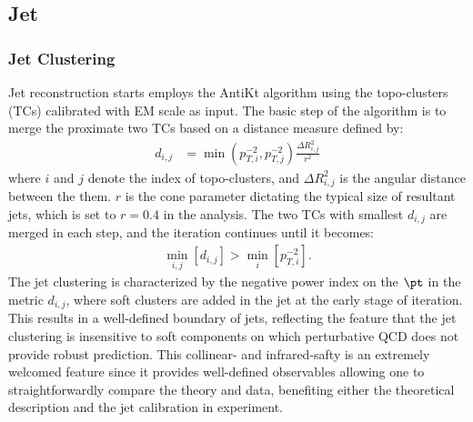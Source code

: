 


\subsection{Jet} \label{sec::objDef::jets}
%
\subsubsection{Jet Clustering} \label{sec::objDef::jets::clustering}
Jet reconstruction starts employs the AntiKt algorithm \cite{141_antiKt} using the topo-clusters (TCs) calibrated with EM scale as input.
The basic step of the algorithm is to merge the proximate two TCs based on a distance measure defined by:
\begin{align}
d_{i,j} & = \min(p_{T,i}^{-2},p_{T,j}^{-2}) \frac{\Delta R^2_{i,j}}{r^2} 
\end{align}
where $i$ and $j$ denote the index of topo-clusters, and $\Delta R^2_{i,j}$ is the angular distance between the them.
$r$ is the cone parameter dictating the typical size of resultant jets, which is set to $r=0.4$ in the analysis.
The two TCs with smallest $d_{i,j}$ are merged in each step, and the iteration continues until it becomes:
\begin{align}
\min_{i,j} \left[ d_{i,j} \right] > \min_{i} \left[ p_{T,i}^{-2} \right].
\end{align}
The \antikt jet clustering is characterized by the negative power index on the $\pt$ in the metric $d_{i,j}$, 
where soft clusters are added in the jet at the early stage of iteration.
This results in a well-defined boundary of jets, reflecting the feature that the jet clustering is insensitive to soft components on which perturbative QCD does not provide robust prediction. This collinear- and infrared-safty is an extremely welcomed feature since it provides well-defined observables allowing one to straightforwardly compare the theory and data, benefiting either the theoretical description and the jet calibration in experiment.



